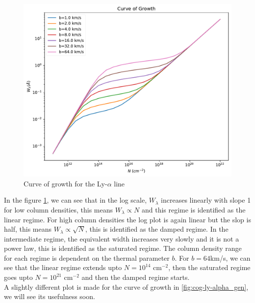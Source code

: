 \documentclass[12pt]{article}
\begin{document}
\begin{figure}[H]
\centering
\includegraphics[width=1\linewidth]{../CoG_Ly-alpha}
\caption{Curve of growth for the Ly-$\alpha$ line}
\label{fig:cog-ly-alpha}
\end{figure}
In the figure \ref{fig:cog-ly-alpha}, we can see that in the log scale, $W_{\lambda}$ increases linearly with slope 1 for low column densities, this means $W_{\lambda} \propto N$ and this regime is identified as the linear regime. For high column densities the log plot is again linear but the slop is half, this means $W_{\lambda} \propto \sqrt{N}$, this is identified as the damped regime. In the intermediate regime, the equivalent width increases very slowly and it is not a power law, this is identified as the saturated regime. The column density range for each regime is dependent on the thermal parameter $b$. For $b = 64$km/s, we can see that the linear regime extends upto $N=10^{14}$ cm$^{-2}$, then the saturated regime goes upto $N=10^{21}$ cm$^{-2}$ and then the damped regime starts.\\


A slightly different plot is made for the curve of growth in \ref{fig:cog-ly-alpha_gen}, we will see its usefulness soon.
\end{document}
